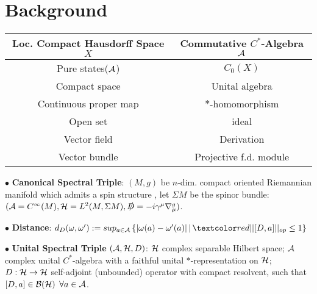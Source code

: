 \section{Background}

\begin{frame} %
    
    
    
    
    \begin{table}[h]
        \centering
        \begin{tabular}{c|c}
             Loc. Compact Hausdorff Space $X$ & Commutative $C^*$-Algebra $\mathcal A$\\
             \hline
             Pure states($\mathcal A$) & $C_0(X)$ \\
             Compact space & Unital algebra \\
             Continuous proper map & $*$-homomorphism \\
             Open set & ideal \\
             Vector field & Derivation \\
             Vector bundle & Projective f.d. module
        \end{tabular}
        
        \label{tab:my_label}
    \end{table}
    
    $\bullet$ \textbf{Canonical Spectral Triple}: $(M, g)$ be $n$-dim. compact oriented Riemannian manifold which admits a spin structure%
    , let $\Sigma M$ %
    be the spinor bundle: $(\mathcal A = C^\infty(M), \mathcal H = L^2(M, \Sigma M), \slashed D = -i \gamma^\mu \nabla^g_\mu)$.
    
    $\bullet$ \textbf{Distance}: $d_D(\omega, \omega') := sup_{a \in \acal} \left\{|\omega(a) - \omega'(a)| \, | \, \rtext{||[D, a]||_{op} \leq 1} \right\}$
    
    $\bullet$ \textbf{Unital Spectral Triple} $(\mathcal A , \mathcal H, D)$: $\mathcal H$ complex separable Hilbert space; $\mathcal A$ complex unital $C^*$-algebra with a faithful unital $*$-representation on $\mathcal H$; $D: \mathcal H \to \mathcal H$ self-adjoint (unbounded) operator with compact resolvent, such that $[D, a] \in \mathcal B(\mathcal H)$ $\forall a \in \mathcal A$.
\end{frame}